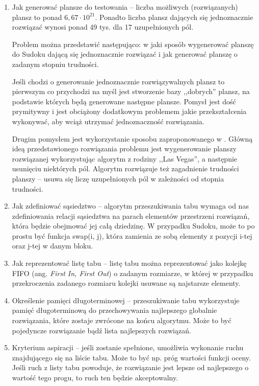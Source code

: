 \documentclass[]{project_report}
\begin{document}
	\begin{enumerate}
		\item Jak generować plansze do testowania -- liczba możliwych (rozwiązanych) plansz to ponad \(6,67 \cdot 10^{21}\)\cite{OEIS}. Ponadto liczba plansz dających się jednoznacznie rozwiązać wynosi ponad 49 tys. dla 17 uzupełnionych pól.
		
		Problem można przedstawić następująco: w jaki sposób wygenerować planszę do Sudoku dającą się jednoznacznie rozwiązać i jak generować planszę o zadanym stopniu trudności.
		
		Jeśli chodzi o generowanie jednoznacznie rozwiązywalnych plansz to pierwszym co przychodzi na myśl jest stworzenie bazy ,,dobrych'' plansz, na podstawie których będą generowane następne plansze. Pomysł jest dość prymitywny i jest obciążony dodatkowym problemem jakie przekształcenia wykonywać, aby wciąż utrzymać jednoznaczność rozwiązania.
		
		Drugim pomysłem jest wykorzystanie sposobu zaproponowanego w \cite{McGuire2013}. Główną ideą przedstawionego rozwiązania problemu jest wygenerowanie planszy rozwiązanej wykorzystując algorytm z rodziny ,,Las Vegas'', a następnie usunięciu niektórych pól. Algorytm rozwiązuje też zagadnienie trudności planszy -- usuwa się liczę uzupełnionych pól w zależności od stopnia trudności.
				
		\item Jak zdefiniować sąsiedztwo -- algorytm przeszukiwania tabu wymaga od nas zdefiniowania relacji sąsiedztwa na parach elementów przestrzeni rozwiązań, która będzie obejmować jej całą dziedzinę.  W przypadku Sudoku, może to po  prostu być funkcja swap(i, j), która zamienia ze sobą elementy z pozycji i-tej oraz j-tej w danym bloku.
		
		\item Jak reprezentować listę tabu -- listę tabu można reprezentować jako kolejkę FIFO (ang. \textit{First In, First Out}) o zadanym rozmiarze, w której w przypadku przekroczenia zadanego rozmiaru kolejki usuwane są najstarsze elementy.
		
		\item Określenie pamięci długoterminowej -- przeszukiwanie tabu wykorzystuje pamięć długoterminową do przechowywania najlepszego globalnie rozwiązania, które zostaje zwrócone na końcu algorytmu. Może to być pojedyncze rozwiązanie bądź lista najlepszych rozwiązań.
		
		\item Kryterium aspiracji -- jeśli zostanie spełnione, umożliwia wykonanie ruchu znajdującego się na liście tabu. Może to być np. próg wartości funkcji oceny. Jeśli ruch z listy tabu powoduje, że rozwiązanie jest lepsze od najlepszego o wartość tego progu, to ruch ten będzie akceptowalny.
		
	\end{enumerate}
	
	\printbibliography
\end{document}
